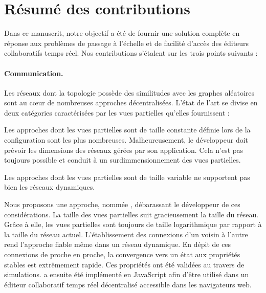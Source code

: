 
\section{Résumé des contributions}
\label{conclu:sec:summary}

Dans ce manuscrit, notre objectif a été de fournir une solution complète en
réponse aux problèmes de passage à l'échelle et de facilité d'accès des éditeurs
collaboratifs temps réel. Nos contributions s'étalent sur les trois points
suivants :

\paragraph{Communication.} Les réseaux dont la topologie possède des similitudes
avec les graphes aléatoires sont au cœur de nombreuses approches
décentralisées. L'état de l'art se divise en deux catégories caractérisées par
les vues partielles qu'elles fournissent :
\begin{inparaenum}[(i)]
\item Les approches dont les vues partielles sont de taille constante définie
  lors de la configuration sont les plus nombreuses. Malheureusement, le
  développeur doit prévoir les dimensions des réseaux gérées par son
  application. Cela n'est pas toujours possible et conduit à un
  surdimmensionnement des vues partielles.
\item Les approches dont les vues partielles sont de taille variable ne
  supportent pas bien les réseaux dynamiques.
\end{inparaenum}
Nous proposons une approche, nommée \SPRAY, débarassant le développeur de ces
considérations. La taille des vues partielles suit gracieusement la taille du
réseau. Grâce à elle, les vues partielles sont toujours de taille logarithmique
par rapport à la taille du réseau actuel. L'établissement des connexions d'un
voisin à l'autre rend l'approche fiable même dans un réseau dynamique. En dépit
de ces connexions de proche en proche, la convergence vers un état aux
propriétés stables est extrêmement rapide. Ces propriétés ont été validées au
travers de simulations. \SPRAY a ensuite été implémenté en JavaScript afin
d'être utilisé dans un éditeur collaboratif temps réel décentralisé accessible
dans les navigateurs web.


